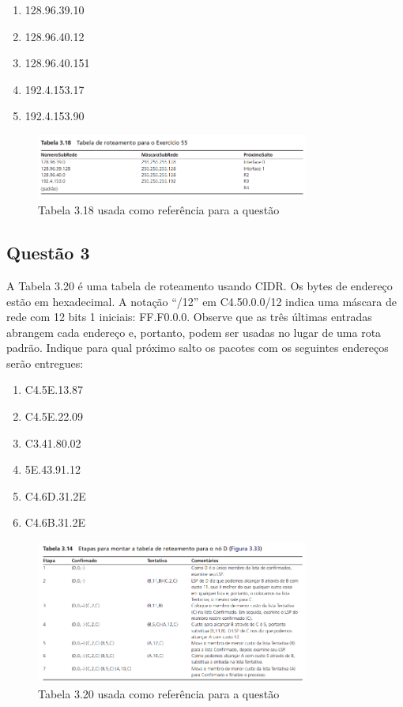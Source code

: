 \begin{enumerate}[label=\alph*.]
    \item 128.96.39.10
    \item 128.96.40.12
    \item 128.96.40.151
    \item 192.4.153.17
    \item 192.4.153.90
\end{enumerate}

\begin{figure}[H]
    \centering
    \includegraphics[width=0.8\textwidth]{images/tabela_3_18.png}
    \caption{Tabela 3.18 usada como referência para a questão} 
    \label{fig:questao_2_tabela}
\end{figure}

\subsection{Questão 3}
A Tabela 3.20 é uma tabela de roteamento usando CIDR. Os bytes de endereço estão em
hexadecimal. A notação “/12” em C4.50.0.0/12 indica uma máscara de rede com 12 bits 1 iniciais:
FF.F0.0.0. Observe que as três últimas entradas abrangem cada endereço e, portanto, podem ser usadas no lugar de uma rota padrão. 
Indique para qual próximo salto os pacotes com os seguintes endereços serão entregues:

\begin{enumerate}[label=\alph*.]
    \item C4.5E.13.87
    \item C4.5E.22.09
    \item C3.41.80.02
    \item 5E.43.91.12
    \item C4.6D.31.2E
    \item C4.6B.31.2E
\end{enumerate}

\begin{figure}[H]
    \centering
    \includegraphics[width=0.8\textwidth]{images/tabela_3_14.png}
    \caption{Tabela 3.20 usada como referência para a questão} 
    \label{fig:questao_3_tabela}
\end{figure}


